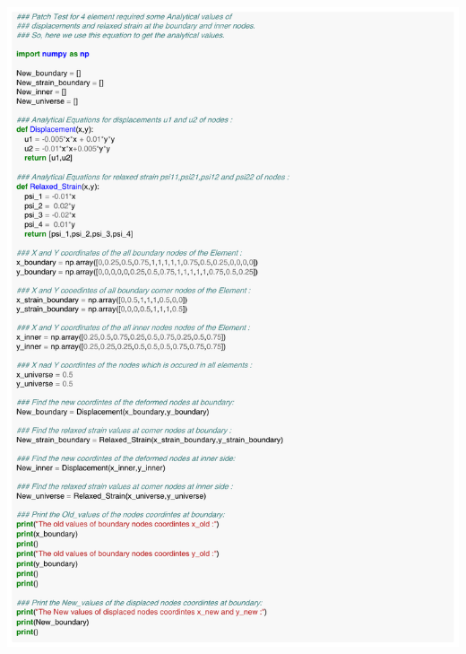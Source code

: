 \documentclass[12pt]{article}
\begin{document}
\begin{appendices}
\includegraphics[scale=0.80,page=2]{Patch_Test_4_elem_eqn.pdf}

\end{appendices}
\end{document}
